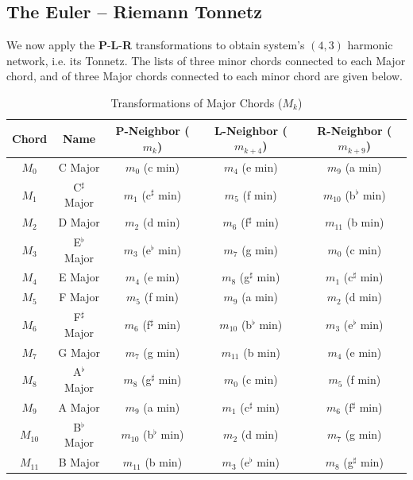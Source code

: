 \documentclass[12pt,letterpaper]{amsart}
\begin{document}
\subsection{The Euler -- Riemann Tonnetz}
We now apply the {\bf P}-{\bf L}-{\bf R} transformations to obtain system's $(4,3)$ harmonic network, i.e. its Tonnetz. The lists of three minor chords connected to each Major chord, and of three Major chords connected to each minor chord are given below.

\begin{table}[H]
    \centering
    \scriptsize
    \renewcommand{\arraystretch}{0.7}
    \caption{\scriptsize Transformations of Major Chords ($M_k$)}
    \label{tab:major_neighbors}
    \begin{tabular}{|c|c||c|c|c|}
        \hline
        \textbf{Chord} & \textbf{Name} & \textbf{P-Neighbor} ($m_k$) & \textbf{L-Neighbor} ($m_{k+4}$) & \textbf{R-Neighbor} ($m_{k+9}$) \\
        \hline
        $M_0$ & C Major & $m_0$ (c min) & $m_4$ (e min) & $m_9$ (a min) \\
        $M_1$ & C$^\sharp$ Major & $m_1$ (c$^\sharp$ min) & $m_5$ (f min) & $m_{10}$ (b$^\flat$ min) \\
        $M_2$ & D Major & $m_2$ (d min) & $m_6$ (f$^\sharp$ min) & $m_{11}$ (b min) \\
        $M_3$ & E$^\flat$ Major & $m_3$ (e$^\flat$ min) & $m_7$ (g min) & $m_0$ (c min) \\
        $M_4$ & E Major & $m_4$ (e min) & $m_8$ (g$^\sharp$ min) & $m_1$ (c$^\sharp$ min) \\
        $M_5$ & F Major & $m_5$ (f min) & $m_9$ (a min) & $m_2$ (d min) \\
        $M_6$ & F$^\sharp$ Major & $m_6$ (f$^\sharp$ min) & $m_{10}$ (b$^\flat$ min) & $m_3$ (e$^\flat$ min) \\
        $M_7$ & G Major & $m_7$ (g min) & $m_{11}$ (b min) & $m_4$ (e min) \\
        $M_8$ & A$^\flat$ Major & $m_8$ (g$^\sharp$ min) & $m_0$ (c min) & $m_5$ (f min) \\
        $M_9$ & A Major & $m_9$ (a min) & $m_1$ (c$^\sharp$ min) & $m_6$ (f$^\sharp$ min) \\
        $M_{10}$ & B$^\flat$ Major & $m_{10}$ (b$^\flat$ min) & $m_2$ (d min) & $m_7$ (g min) \\
        $M_{11}$ & B Major & $m_{11}$ (b min) & $m_3$ (e$^\flat$ min) & $m_8$ (g$^\sharp$ min) \\
        \hline
    \end{tabular}
\end{table}
\end{document}
